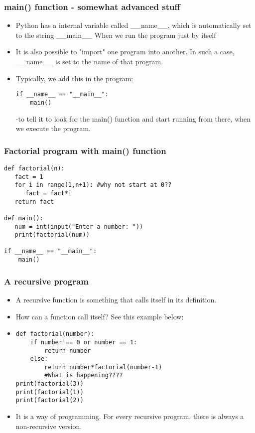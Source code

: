 \documentclass{beamer}
\begin{document}
\begin{frame}[fragile]
\frametitle{main() function - somewhat advanced stuff}
\begin{itemize}
\item Python has a internal variable called \_\_name\_\_, which is automatically set to the string \_\_main\_\_ When we run the program just by itself \pause
\item It is also possible to "import" one program into another. In such a case, \_\_name\_\_ is set to the name of that program.
\item Typically, we add this in the program:
\begin{verbatim}
if __name__ == "__main__":
    main()
\end{verbatim}
-to tell it to look for the main() function and start running from there, when we execute the program.
\end{itemize}
\end{frame}

\begin{frame}[fragile]
\frametitle{Factorial program with main() function}
\scriptsize
\begin{verbatim}
def factorial(n):
   fact = 1
   for i in range(1,n+1): #why not start at 0?? 
      fact = fact*i
   return fact

def main():
   num = int(input("Enter a number: "))
   print(factorial(num))

if __name__ == "__main__":
    main()
\end{verbatim}
\end{frame}

\begin{frame}[fragile]
\frametitle{A recursive program}
\begin{itemize}
\item A recursive function is something that calls itself in its definition. 
\item How can a function call itself? See this example below:
\item \begin{verbatim}
def factorial(number):
    if number == 0 or number == 1:
        return number
    else:
        return number*factorial(number-1) 
        #What is happening????
print(factorial(3))
print(factorial(1))
print(factorial(2))
\end{verbatim} \pause
\item It is a way of programming. For every recursive program, there is always a non-recursive version. 
\end{itemize}
\end{frame}
\end{document}
